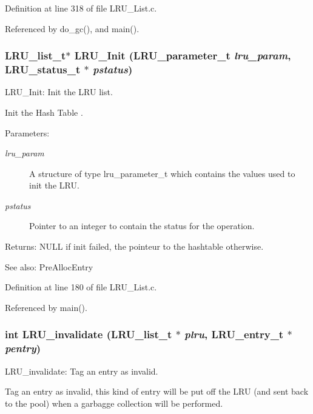 Definition at line 318 of file LRU\_\-List.c.

Referenced by do\_\-gc(), and main().
\subsubsection{\setlength{\rightskip}{0pt plus 5cm}LRU\_\-list\_\-t$\ast$ LRU\_\-Init (LRU\_\-parameter\_\-t {\em lru\_\-param}, LRU\_\-status\_\-t $\ast$ {\em pstatus})}\label{group__LRUExportedFunctions_ga0}


LRU\_\-Init: Init the LRU list.

Init the Hash Table .

\begin{Desc}
\item[Parameters:]
\begin{description}
\item[{\em lru\_\-param}]A structure of type lru\_\-parameter\_\-t which contains the values used to init the LRU. \item[{\em pstatus}]Pointer to an integer to contain the status for the operation.\end{description}
\end{Desc}
\begin{Desc}
\item[Returns:]NULL if init failed, the pointeur to the hashtable otherwise.\end{Desc}
\begin{Desc}
\item[See also:]Pre\-Alloc\-Entry \end{Desc}


Definition at line 180 of file LRU\_\-List.c.

Referenced by main().
\subsubsection{\setlength{\rightskip}{0pt plus 5cm}int LRU\_\-invalidate (LRU\_\-list\_\-t $\ast$ {\em plru}, LRU\_\-entry\_\-t $\ast$ {\em pentry})}\label{group__LRUExportedFunctions_ga1}


LRU\_\-invalidate: Tag an entry as invalid.

Tag an entry as invalid, this kind of entry will be put off the LRU (and sent back to the pool) when a garbagge collection will be performed.

